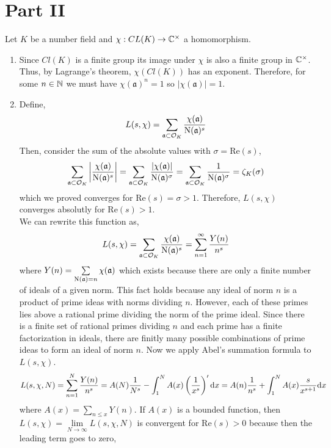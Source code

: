 \documentclass[12pt]{extarticle}
\begin{document}
\section*{Part II}

Let $K$ be a number field and $\chi : CL(K) \to \mathbb{C}^\times$ a homomorphism.  

\begin{enumerate}

\item Since $Cl(K)$ is a finite group its image under $\chi$ is also a finite group in $\mathbb{C}^\times$. Thus, by Lagrange's theorem, $\chi(Cl(K))$ has an exponent. Therefore, for some $n \in \mathbb{N}$ we must have $\chi(\mathfrak{a})^n = 1$ so $|\chi(\mathfrak{a})| = 1$.   

\item Define,
\[L(s, \chi) = \sum_{\mathfrak{a} \subset \mathcal{O}_{K}} \frac{\chi(\mathfrak{a})}{\mathrm{N}(\mathfrak{a})^s} \]
Then, consider the sum of the absolute values with $\sigma = \mathrm{Re}(s)$,
\[\sum_{\mathfrak{a} \subset \mathcal{O}_{K}} \left| \frac{\chi(\mathfrak{a})}{\mathrm{N}(\mathfrak{a})^{s}} \right| = \sum_{\mathfrak{a} \subset \mathcal{O}_{K}} \frac{|\chi(\mathfrak{a})|}{\mathrm{N}(\mathfrak{a})^{\sigma}} = \sum_{\mathfrak{a} \subset \mathcal{O}_{K}} \frac{1}{\mathrm{N}(\mathfrak{a})^\sigma} = \zeta_K(\sigma) \]
which we proved converges for $\mathrm{Re}(s) = \sigma > 1$. Therefore, $L(s, \chi)$ converges absolutly for $\mathrm{Re}(s) > 1$. \bigskip \\
We can rewrite this function as,
\[ L(s, \chi) = \sum_{\mathfrak{a} \subset \mathcal{O}_{K}} \frac{\chi(\mathfrak{a})}{\mathrm{N}(\mathfrak{a})^s} = \sum_{n = 1}^{\infty} \frac{Y(n)}{n^s} \]
where $Y(n) = \sum\limits_{\mathrm{N}(\mathfrak{a}) = n} \chi(\mathfrak{a})$ which exists because there are only a finite number of ideals of a given norm. This fact holds because any ideal of norm $n$ is a product of prime ideas with norms dividing $n$. However, each of these primes lies above a rational prime dividing the norm of the prime ideal. Since there is a finite set of rational primes dividing $n$ and each prime has a finite factorization in ideals, there are finitly many possible combinations of prime ideas to form an ideal of norm $n$. Now we apply Abel's summation formula to $L(s, \chi)$.
\[ L(s, \chi, N) =  \sum_{n = 1}^{N} \frac{Y(n)}{n^s} = A(N) \frac{1}{N^s} - \int_{1}^{N} A(x) \left(\frac{1}{x^s}\right)' \mathrm{d}x = A(n) \frac{1}{n^s} + \int_{1}^{N} A(x) \frac{s}{x^{s+1}} \mathrm{d}x\]
where $A(x) = \sum\limits_{n \le x} Y(n)$. If $A(x)$ is a bounded function, then $L(s, \chi) = \lim\limits_{N \to \infty} L(s, \chi, N)$ is convergent for $\mathrm{Re}(s) > 0$ because then the leading term goes to zero,

\end{enumerate}
\end{document}
